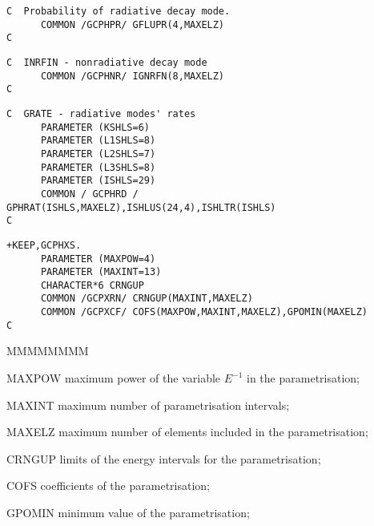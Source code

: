 \begin{verbatim}
C  Probability of radiative decay mode.
      COMMON /GCPHPR/ GFLUPR(4,MAXELZ)
C
\end{verbatim}

\begin{verbatim}
C  INRFIN - nonradiative decay mode
      COMMON /GCPHNR/ IGNRFN(8,MAXELZ)
C
\end{verbatim}

\begin{verbatim}
C  GRATE - radiative modes' rates
      PARAMETER (KSHLS=6)
      PARAMETER (L1SHLS=8)
      PARAMETER (L2SHLS=7)
      PARAMETER (L3SHLS=8)
      PARAMETER (ISHLS=29)
      COMMON / GCPHRD / GPHRAT(ISHLS,MAXELZ),ISHLUS(24,4),ISHLTR(ISHLS)
C
\end{verbatim}

\begin{verbatim}
+KEEP,GCPHXS.
      PARAMETER (MAXPOW=4)
      PARAMETER (MAXINT=13)
      CHARACTER*6 CRNGUP
      COMMON /GCPXRN/ CRNGUP(MAXINT,MAXELZ)
      COMMON /GCPXCF/ COFS(MAXPOW,MAXINT,MAXELZ),GPOMIN(MAXELZ)
C
\end{verbatim}
\begin{DLtt}{MMMMMMMM}
\item[MAXPOW] maximum power of the variable $E^{-1}$ in the parametrisation;
\item[MAXINT] maximum number of parametrisation intervals;
\item[MAXELZ] maximum number of elements included in the parametrisation;
\item[CRNGUP] limits of the energy intervals for the parametrisation;
\item[COFS] coefficients of the parametrisation;
\item[GPOMIN] minimum value of the parametrisation;
\end{DLtt}
